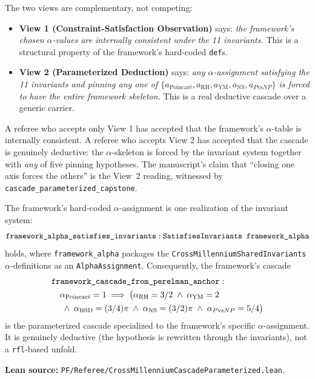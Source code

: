 \begin{keyidea}
\label{ki:cascade-two-views-together}
The two views are complementary, not competing:
\begin{itemize}
\item \textbf{View 1 (Constraint-Satisfaction Observation)} says:
\emph{the framework's chosen $\alpha$-values are internally
consistent under the 11 invariants.} This is a structural property
of the framework's hard-coded \texttt{def}s.
\item \textbf{View 2 (Parameterized Deduction)} says: \emph{any
$\alpha$-assignment satisfying the 11 invariants and pinning any
one of $\{a_{\text{Poincar\'e}}, a_{\text{RH}}, a_{\text{YM}},
a_{\text{NS}}, a_{P\text{vs}NP}\}$ is forced to have the entire
framework skeleton.} This is a real deductive cascade over a
generic carrier.
\end{itemize}
A referee who accepts only View 1 has accepted that the
framework's $\alpha$-table is internally consistent. A referee
who accepts View 2 has accepted that the cascade is genuinely
deductive: the $\alpha$-skeleton is forced by the invariant
system together with \emph{any} of five pinning hypotheses. The
manuscript's claim that ``closing one axis forces the others'' is
the View~2 reading, witnessed by
\texttt{cascade\_\allowbreak{}parameterized\_\allowbreak{}capstone}.

\end{keyidea}

\begin{theorem}
\label{thm:parameterized-cascade-specializes-to-framework}
The framework's hard-coded $\alpha$-assignment is one realization
of the invariant system:
\[
\texttt{framework\_\allowbreak{}alpha\_\allowbreak{}satisfies\_\allowbreak{}invariants} :
\texttt{Satisfies\allowbreak{}Invariants framework\_\allowbreak{}alpha}
\]
holds, where \texttt{framework\_alpha} packages the
\texttt{Cross\allowbreak{}Millennium\allowbreak{}Shared\allowbreak{}Invariants}
$\alpha$-definitions as an \texttt{AlphaAssignment}. Consequently,
the framework's cascade
\begin{align*}
&\texttt{framework\_\allowbreak{}cascade\_\allowbreak{}from\_\allowbreak{}perelman\_\allowbreak{}anchor}: \\
&\quad \alpha_{\text{Poincar\'e}} = 1 \;\Longrightarrow\; \bigl(\alpha_{\text{RH}} = 3/2 \;\wedge\; \alpha_{\text{YM}} = 2 \\
&\quad \;\wedge\; \alpha_{\text{BSD}} = (3/4)\pi \;\wedge\; \alpha_{\text{NS}} = (3/2)\pi \;\wedge\; \alpha_{P\text{vs}NP} = 5/4\bigr)
\end{align*}
is the parameterized cascade specialized to the framework's
specific $\alpha$-assignment. It is genuinely deductive (the
hypothesis is rewritten through the invariants), not a
\texttt{rfl}-based unfold.

\textbf{Lean source:}
\texttt{PF/\allowbreak{}Referee/\allowbreak{}Cross\allowbreak{}Millennium\allowbreak{}Cascade\allowbreak{}Parameterized.\allowbreak{}lean}.
\end{theorem}

